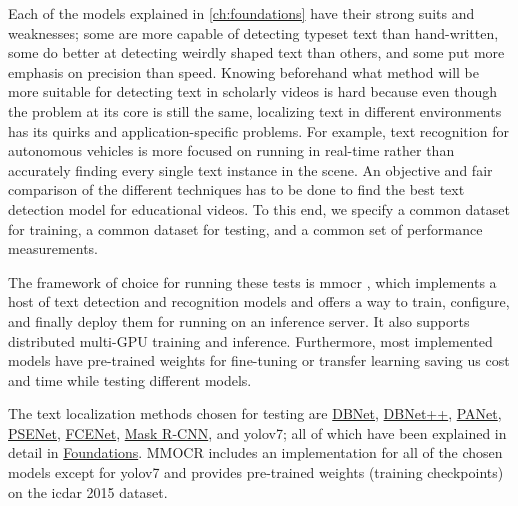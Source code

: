 Each of the models explained in \ref{ch:foundations} have their strong suits and weaknesses; some are more capable of detecting typeset text than hand-written, some do better at detecting weirdly shaped text than others, and some put more emphasis on precision than speed. Knowing beforehand what method will be more suitable for detecting text in scholarly videos is hard because even though the problem at its core is still the same, localizing text in different environments has its quirks and application-specific problems. For example, text recognition for autonomous vehicles is more focused on running in real-time rather than accurately finding every single text instance in the scene. An objective and fair comparison of the different techniques has to be done to find the best text detection model for educational videos. To this end, we specify a common dataset for training, a common dataset for testing, and a common set of performance measurements.

The framework of choice for running these tests is \gls{mmocr} \cite{mmocr_contributors_openmmlab_2020}, which implements a host of text detection and recognition models and offers a way to train, configure,  and finally deploy them for running on an inference server. It also supports distributed multi-GPU training and inference. Furthermore, most implemented models have pre-trained weights for fine-tuning or transfer learning saving us cost and time while testing different models.

The text localization methods chosen for testing are \hyperref[dbnet]{DBNet}, \hyperref[dbnetpp]{DBNet++}, \hyperref[panet]{PANet}, \hyperref[psenet]{PSENet}, \hyperref[fcenet]{FCENet}, \hyperref[maskrcnn]{Mask R-CNN}, and \gls{yolov7}; all of which have been explained in detail in \hyperref[ch:foundations]{Foundations}. MMOCR includes an implementation for all of the chosen models except for \gls{yolov7} and provides pre-trained weights (training checkpoints) on the \gls{icdar} 2015 \cite{karatzas_icdar_2015} dataset.

